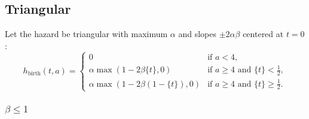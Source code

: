 \documentclass{jpmarticle}
\begin{document}
\subsection{Triangular}

Let the hazard be triangular with maximum $\alpha$ and slopes
$\pm 2 \alpha \beta$ centered at $t = 0$:
\begin{equation}
  h_{\text{birth}} (t, a) =
  \begin{cases}
    0 & \text{if $a < 4$},
    \\
    \alpha \max\left(1 - 2 \beta \{t\}, 0\right)
    & \text{if $a \geq 4$ and $\{t\} < \frac{1}{2}$},
    \\
    \alpha \max\left(1 - 2 \beta (1 - \{t\}), 0\right)
    & \text{if $a \geq 4$ and $\{t\} \geq \frac{1}{2}$}.
  \end{cases}
\end{equation}

\subsubsection{$\beta \leq 1$}
\end{document}
